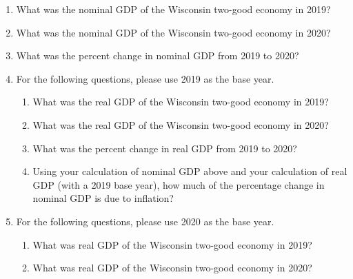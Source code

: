 \documentclass[
    letterpaper,paper=portrait,fleqn,
    DIV=16,fontsize=12pt,twoside=semi,
    parskip=full-,
    headings=standardclasses]
{scrartcl}
\begin{document}
\begin{enumerate}

\item What was the nominal GDP of the Wisconsin two-good economy in 2019?

\vfill

\item What was the nominal GDP of the Wisconsin two-good economy in 2020?

\vfill

\item What was the percent change in nominal GDP from 2019 to 2020?

\vfill

\vspace{-2\baselineskip}
\clearpage

\item For the following questions, please use 2019 as the base year.

\begin{enumerate}

\item What was the real GDP of the Wisconsin two-good economy in 2019?

\vfill

\item What was the real GDP of the Wisconsin two-good economy in 2020?

\vfill

\item What was the percent change in real GDP from 2019 to 2020?

\vfill

\item Using your calculation of nominal GDP above and your calculation of real GDP (with a 2019 base year), how much of the percentage change in nominal GDP is due to inflation?

\vfill

\end{enumerate}

\item For the following questions, please use 2020 as the base year.

\begin{enumerate}

\item What was real GDP of the Wisconsin two-good economy in 2019?

\vfill

\item What was real GDP of the Wisconsin two-good economy in 2020?


\end{enumerate}
\end{enumerate}
\end{document}

